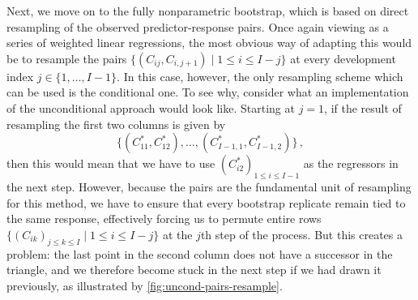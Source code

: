 \documentclass[a4paper]{book}
\begin{document}
Next, we move on to the fully nonparametric bootstrap, which is based on direct resampling of the observed predictor-response pairs. Once again viewing  as a series of weighted linear regressions, the most obvious way of adapting this would be to resample the pairs ${\{ (C_{ij}, C_{i, j + 1}) \mid 1 \leq i \leq I - j \}}$ at every development index $j \in \{ 1, \dots, I - 1 \}$. In this case, however, the only resampling scheme which can be used is the conditional one. To see why, consider what an implementation of the unconditional approach would look like. Starting at $j = 1$, if the result of resampling the first two columns is given by
\begin{displaymath}
  \{ (C^*_{11}, C^*_{12}), \dots, (C^*_{I - 1, 1}, C^*_{I - 1, 2}) \} \,,
\end{displaymath}
then this would mean that we have to use $(C^*_{i2})_{1 \leq i \leq I - 1}$ as the regressors in the next step. However, because the pairs are the fundamental unit of resampling for this method, we have to ensure that every bootstrap replicate remain tied to the same response, effectively forcing us to permute entire rows $\{ (C_{ik})_{j \leq k \leq I} \mid 1 \leq i \leq I - j\}$ at the $j$th step of the process. But this creates a problem: the last point in the second column does not have a successor in the triangle, and we therefore become stuck in the next step if we had drawn it previously, as illustrated by \cref{fig:uncond-pairs-resample}.
\end{document}
